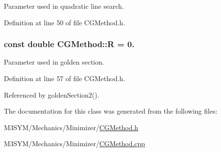 Parameter used in quadratic line search. 



Definition at line 50 of file C\+G\+Method.\+h.

\hypertarget{classCGMethod_a2e7906b4b29a1b76dca43d56eaf2efac}{
\subsubsection[{R}]{\setlength{\rightskip}{0pt plus 5cm}const double C\+G\+Method\+::\+R = 0.\hspace{0.3cm}{\ttfamily [protected]}}}\label{classCGMethod_a2e7906b4b29a1b76dca43d56eaf2efac}


Parameter used in golden section. 



Definition at line 57 of file C\+G\+Method.\+h.



Referenced by golden\+Section2().



The documentation for this class was generated from the following files\+:\begin{DoxyCompactItemize}
\item 
M3\+S\+Y\+M/\+Mechanics/\+Minimizer/\hyperlink{CGMethod_8h}{C\+G\+Method.\+h}\item 
M3\+S\+Y\+M/\+Mechanics/\+Minimizer/\hyperlink{CGMethod_8cpp}{C\+G\+Method.\+cpp}\end{DoxyCompactItemize}
